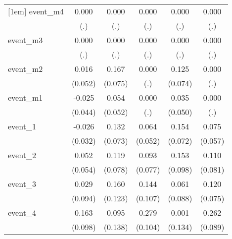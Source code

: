 {\begin{tabular}{l*{5}{c}}
[1em]
event\_m4    &       0.000         &       0.000         &       0.000         &       0.000         &       0.000         \\
            &         (.)         &         (.)         &         (.)         &         (.)         &         (.)         \\
[1em]
event\_m3    &       0.000         &       0.000         &       0.000         &       0.000         &       0.000         \\
            &         (.)         &         (.)         &         (.)         &         (.)         &         (.)         \\
[1em]
event\_m2    &       0.016         &       0.167\sym{*}  &       0.000         &       0.125         &       0.000         \\
            &     (0.052)         &     (0.075)         &         (.)         &     (0.074)         &         (.)         \\
[1em]
event\_m1    &      -0.025         &       0.054         &       0.000         &       0.035         &       0.000         \\
            &     (0.044)         &     (0.052)         &         (.)         &     (0.050)         &         (.)         \\
[1em]
event\_1     &      -0.026         &       0.132         &       0.064         &       0.154\sym{*}  &       0.075         \\
            &     (0.032)         &     (0.073)         &     (0.052)         &     (0.072)         &     (0.057)         \\
[1em]
event\_2     &       0.052         &       0.119         &       0.093         &       0.153         &       0.110         \\
            &     (0.054)         &     (0.078)         &     (0.077)         &     (0.098)         &     (0.081)         \\
[1em]
event\_3     &       0.029         &       0.160         &       0.144         &       0.061         &       0.120         \\
            &     (0.094)         &     (0.123)         &     (0.107)         &     (0.088)         &     (0.075)         \\
[1em]
event\_4     &       0.163         &       0.095         &       0.279\sym{**} &       0.001         &       0.262\sym{**} \\
            &     (0.098)         &     (0.138)         &     (0.104)         &     (0.134)         &     (0.089)         \\

\end{tabular}}
